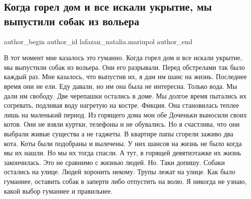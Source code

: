  
 
 
 
 

\subsection{Когда горел дом и все искали укрытие, мы выпустили собак из вольера}
\label{sec:31_03_2022.fb.lafazan_natalia.mariupol.3.kogda_gorel_dom_my_vypustili_sobak_iz_voljera}

\ifcmt
 author_begin
   author_id lafazan_natalia.mariupol
 author_end
\fi

В тот момент мне казалось это гуманно. Когда горел дом и все искали укрытие, мы
выпустили собак из вольера. Они его разрывали. Перед обстрелами так было каждый
раз. Мне казалось, что выпустив их, я дам им шанс на жизнь. Последнее время они
не ели. Еду давали, но им она была не интересна. Только вода. Мы дали им
свободу. Две черепашки остались в доме. Мы долгое время пытались их согревать,
подливая воду нагретую на костре. Фикция. Она становилась теплее лишь на
маленький период. Из горящего дома мои обе Доченьки выносили своих котов. Они
не взяли куртки, телефоны и не обувались. Но я счастлива, что они выбрали живые
существа а не гаджеты. В квартире папы сгорели заживо два кота. Коты были
подобраны и вылечены. У них шансов на жизнь не было когда мы их нашли. Но мы их
тогда спасли. А тут, в горящей девятиэтажке их жизнь закончилась. Это не
сравнимо с жизнью людей. Но. Таки допишу. Собаки остались на улице. Людей
хоронить некому. Трупы лежат на улице. Как было гуманнее, оставить собак в
заперти либо отпустить на волю. Я никогда не узнаю, какой выбор гуманнее и
правильнее.

